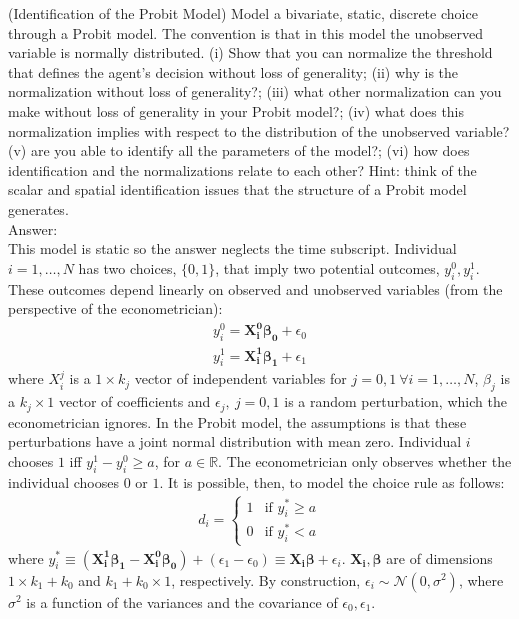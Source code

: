 \begin{exercise} (Identification of the Probit Model) \label{exercise:idenprobit}
Model a bivariate, static, discrete choice through a Probit model. The convention is that in this model the unobserved variable is normally distributed. (i) Show that you can normalize the threshold that defines the agent's decision without loss of generality;  (ii) why is the normalization without loss of generality?; (iii) what other normalization can you make without loss of generality in your Probit model?; (iv) what does this normalization implies with respect to the distribution of the unobserved variable? (v) are you able to identify all the parameters of the model?; (vi) how does identification and the normalizations relate to each other? Hint: think of the scalar and spatial identification issues that the structure of a Probit model generates.\\
\noindent Answer:\\
\noindent This model is static so the answer neglects the time subscript. Individual $i = 1, \ldots, N$ has two choices, $\{0,1\}$, that imply two potential outcomes, $y_{i}^{0}, y_{i}^{1}$. These outcomes depend linearly on observed and unobserved variables (from the perspective of the econometrician):
\begin{eqnarray}
y_{i}^{0} = \mathbf{X_{i}^0 \beta_{0}} + \epsilon_{0} \\ \nonumber
y_{i}^{1} = \mathbf{X_{i}^1 \beta_{1}} + \epsilon_{1}
\end{eqnarray} 
\noindent where $X_{i}^{j}$ is a $1 \times k_{j}$ vector of independent variables for $j=0,1 \ \forall i = 1, \ldots, N$, $\beta_{j}$ is a $ k_{j} \times 1$ vector of coefficients and $\epsilon_{j}, \ j=0,1$ is a random perturbation, which the econometrician ignores. In the Probit model, the assumptions is that these perturbations have a joint normal distribution with mean zero. Individual $i$ chooses $1$ iff $y_{i}^{1} - y_{i}^{0} \geq a$, for $a \in \mathbb{R}$. The econometrician only observes whether the individual chooses $0$ or $1$. It is possible, then, to model the choice rule as follows:
\begin{eqnarray}
d_{i} =
\begin{cases}
1 & \text{if } y_{i}^{*} \geq a  \\
0 & \text{if } y_{i}^{*} < a
\end{cases}
\end{eqnarray}
\noindent where  $y_{i}^{*} \equiv  (\mathbf{X_{i}^1 \beta_{1}} - \mathbf{X_{i}^0 \beta_{0}}) + (\epsilon_{1} - \epsilon_{0}) \equiv \mathbf{X_{i} \beta} + \epsilon_{i}$. $\mathbf{X_{i}}, \mathbf{\beta}$ are of dimensions $1 \times k_{1}+k_{0}$ and $k_{1}+k_{0} \times 1$, respectively. By construction, $\epsilon_{i} \sim \mathcal{N} (0, \sigma^2)$, where $\sigma^2$ is a function of the variances and the covariance of $\epsilon_{0}, \epsilon_{1}$.\\

\end{exercise}
